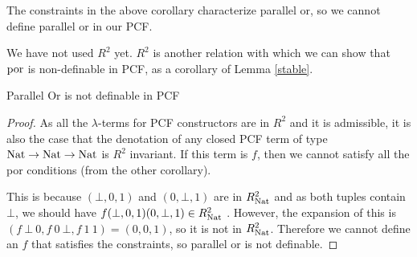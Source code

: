 The constraints in the above corollary characterize parallel or, so we cannot define parallel or in our PCF.

We have not used $R^2$ yet. $R^2$ is another relation with which we can show that $\operatorname{por}$ is non-definable in 
PCF, as a corollary of Lemma 
 \ref{stable}.
\vspace{0.5cm}

\begin{cor}
Parallel Or is not definable in PCF 
\end{cor}

\begin{proof}{\citep{Streicher06}}
As all the $\lambda$-terms for PCF constructors are in $R^2$ and it is admissible, it is also the case that the denotation of any closed PCF term of type $\operatorname{Nat} \to \operatorname{Nat} \to \operatorname{Nat}$ is $R^2$ invariant.  If this term is $f$, then we cannot satisfy all the por conditions (from the other corollary).

This is because $(\bot, 0, 1)$ and $(0, \bot, 1)$ are in $R_{\operatorname{Nat}}^2$ and as both tuples contain $\bot$, we should have $f (\bot, 0, 1)(0, \bot, 1) \in R_{\operatorname{Nat}}^2$ . However, the expansion of this is $(f \ \bot \ 0, f \ 0 \ \bot, f \ 1 \ 1) = (0,0,1)$, so it is not in $R_{\operatorname{Nat}}^2$. Therefore we cannot define an $f$ that satisfies the constraints, so parallel or is not definable.
\end{proof}